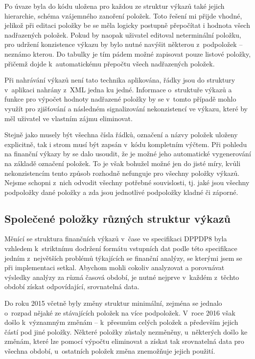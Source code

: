Po úvaze byla do kódu uložena pro každou ze struktur výkazů také jejich hierarchie, schéma vzájemného zanoření položek. Toto řešení mi přijde vhodné, jelikož při editaci položky be se měla logicky postupně přepočítat i hodnota všech nadřazených položek. Pokud by naopak uživatel editoval neterminální položku, pro udržení konzistence výkazu by bylo nutné navýšit některou z~podpoložek -- neznámo kterou. Do tabulky je tím pádem možné zapisovat pouze listové položky, přičemž dojde k~automatickému přepočtu všech nadřazených položek.

Při nahrávání výkazů není tato technika aplikována, řádky jsou do struktury v~aplikaci nahrány z~XML jedna ku jedné. Informace o~struktuře výkazů a funkce pro výpočet hodnoty nadřazené položky by se v~tomto případě mohlo využít pro zjišťování a následném signalizování nekonzistencí ve výkazu, které by měl uživatel ve vlastním zájmu eliminovat.

Stejně jako musely být všechna čísla řádků, označení a názvy položek uloženy explicitně, tak i strom musí být zapsán v~kódu kompletním výčtem. Při pohledu na finanční výkazy by se dalo usoudit, že je možné jeho automatické vygenerování na základě označení položek. To je však bohužel možné jen do jisté míry, kvůli nekonzistencím tento způsob rozhodně nefunguje pro všechny položky výkazů. Nejsme schopni z~nich odvodit všechny potřebné souvislosti, tj. jaké jsou všechny podpoložky dané položky a zda jsou jednotlivé podpoložky kladné či záporné.


\subsection{Společené položky různých struktur výkazů}
\label{spol}
Měnící se struktura finančních výkazů v~čase ve specifikaci DPPDP8 byla vzhledem k~striktnímu dodržení formátu vstupních dat podle této specifikace jedním z~největších problémů týkajících se finanční analýzy, se kterými jsem se při implementaci setkal. Abychom mohli cokoliv analyzovat a porovnávat výsledky analýzy za různá časová období, je nutné nejprve v~každém z~těchto období získat odpovídající, srovnatelná data. 

Do roku 2015 včetně byly změny struktur minimální, zejména se jednalo o~rozpad nějaké ze stávajících položek na více podpoložek. V~roce 2016 však došlo k~významným změnám -- k~přesunům celých položek a především jejich částí pod jiné položky. Některé položky zůstaly nezměněny, u~některých došlo ke změnám, které lze pomocí výpočtu eliminovat a získat tak srovnatelná data pro všechna období, u~ostatních položek změna znemožňuje jejich použití. 

